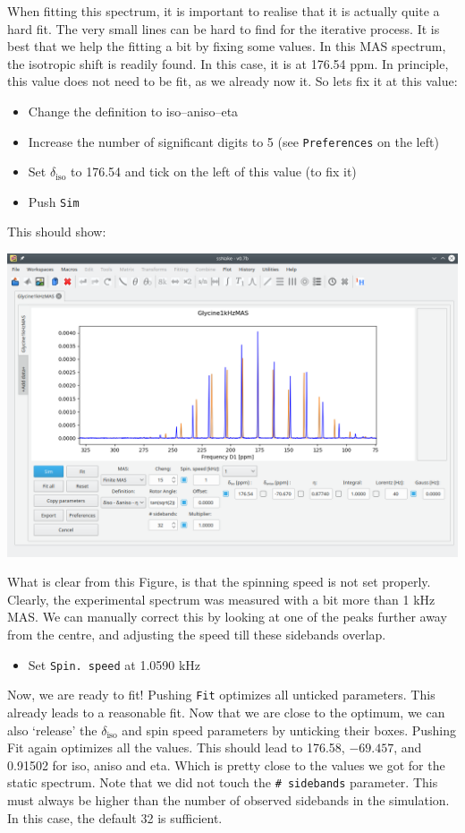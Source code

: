 \documentclass[11pt,a4paper]{article}
\begin{document}
When fitting this spectrum, it is important to realise that it is actually quite a hard fit. The
very small lines can be hard to find for the iterative process. It is best that we help the fitting
a bit by fixing some values. In this MAS spectrum, the isotropic shift is readily found. In this
case, it is at 176.54 ppm. In principle, this value does not need to be fit, as we already now it.
So lets fix it at this value:
\begin{itemize}
  \item Change the definition to iso--aniso--eta
  \item Increase the number of significant digits to 5 (see \texttt{Preferences} on the left)
	\item Set $\delta_\text{iso}$ to 176.54 and tick on the left of this value (to fix it)
	 \item Push \texttt{Sim}
\end{itemize}
This should show:
\begin{center}
\includegraphics[width=0.8\linewidth]{Figs/Fig9.png}
\end{center}
What is clear from this Figure, is that the spinning speed is not set properly. Clearly, the
experimental spectrum was measured with a bit more than 1 kHz MAS. We can manually correct this by
looking at one of the peaks further away from the centre, and adjusting the speed till these
sidebands overlap.
\begin{itemize}
  \item Set \texttt{Spin.\ speed} at 1.0590 kHz
\end{itemize}
Now, we are ready to fit! Pushing \texttt{Fit} optimizes all unticked parameters. This already leads
to a reasonable fit. Now that we are close to the optimum, we can also `release' the
$\delta_\text{iso}$ and spin speed parameters by unticking their boxes. Pushing Fit again optimizes
all the values. This should lead to 176.58, $-69.457$, and 0.91502 for iso, aniso and eta. Which is
pretty close to the values we got for the static spectrum. Note that we did not touch the \texttt{\#
sidebands} parameter. This must always be higher than the number of observed sidebands in the
simulation. In this case, the default 32 is sufficient.
\end{document}
